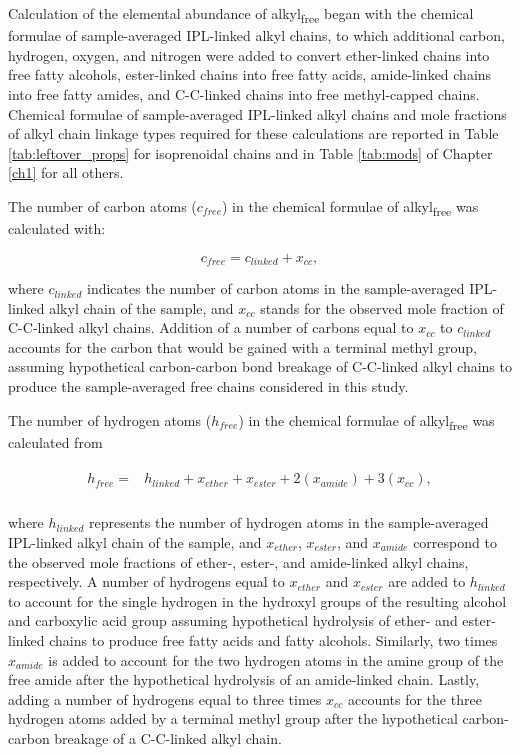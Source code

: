 Calculation of the elemental abundance of alkyl\textsubscript{free} began with the chemical formulae of sample-averaged IPL-linked alkyl chains, to which additional carbon, hydrogen, oxygen, and nitrogen were added to convert ether-linked chains into free fatty alcohols, ester-linked chains into free fatty acids, amide-linked chains into free fatty amides, and C-C-linked chains into free methyl-capped chains. Chemical formulae of sample-averaged IPL-linked alkyl chains and mole fractions of alkyl chain linkage types required for these calculations are reported in Table \ref{tab:leftover_props} for isoprenoidal chains and in Table \ref{tab:mods} of Chapter \ref{ch1} for all others.

The number of carbon atoms ($c_{free}$) in the chemical formulae of alkyl\textsubscript{free} was calculated with:

\begin{equation}
    c_{free} = c_{linked} + x_{cc},
\end{equation}

\noindent where $c_{linked}$ indicates the number of carbon atoms in the sample-averaged IPL-linked alkyl chain of the sample, and $x_{cc}$ stands for the observed mole fraction of C-C-linked alkyl chains. Addition of a number of carbons equal to $x_{cc}$ to $c_{linked}$ accounts for the carbon that would be gained with a terminal methyl group, assuming hypothetical carbon-carbon bond breakage of C-C-linked alkyl chains to produce the sample-averaged free chains considered in this study.

The number of hydrogen atoms ($h_{free}$) in the chemical formulae of alkyl\textsubscript{free} was calculated from

\begin{align}
\begin{split}
    h_{free} = &h_{linked} + x_{ether} + x_{ester} + 2(x_{amide}) + 3(x_{cc}), \\
\end{split}
\end{align}

\noindent where $h_{linked}$ represents the number of hydrogen atoms in the sample-averaged IPL-linked alkyl chain of the sample, and $x_{ether}$, $x_{ester}$, and $x_{amide}$ correspond to the observed mole fractions of ether-, ester-, and amide-linked alkyl chains, respectively. A number of hydrogens equal to $x_{ether}$ and $x_{ester}$ are added to $h_{linked}$ to account for the single hydrogen in the hydroxyl groups of the resulting alcohol and carboxylic acid group assuming hypothetical hydrolysis of ether- and ester-linked chains to produce free fatty acids and fatty alcohols. Similarly, two times $x_{amide}$ is added to account for the two hydrogen atoms in the amine group of the free amide after the hypothetical hydrolysis of an amide-linked chain. Lastly, adding a number of hydrogens equal to three times $x_{cc}$ accounts for the three hydrogen atoms added by a terminal methyl group after the hypothetical carbon-carbon breakage of a C-C-linked alkyl chain.

